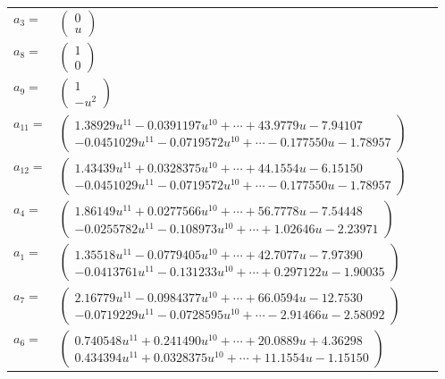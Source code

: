 \documentclass[1p]{elsarticle_modified}
\theoremstyle{definition}
\begin{document}
\begin{tabular}{m{7pt} m{180pt} m{7pt} m{180pt} }
\flushright $a_{3}=$&$\begin{pmatrix}0\\u\end{pmatrix}$ \\
\flushright $a_{8}=$&$\begin{pmatrix}1\\0\end{pmatrix}$ \\
\flushright $a_{9}=$&$\begin{pmatrix}1\\- u^2\end{pmatrix}$ \\
\flushright $a_{11}=$&$\begin{pmatrix}1.38929 u^{11}-0.0391197 u^{10}+\cdots+43.9779 u-7.94107\\-0.0451029 u^{11}-0.0719572 u^{10}+\cdots-0.177550 u-1.78957\end{pmatrix}$ \\
\flushright $a_{12}=$&$\begin{pmatrix}1.43439 u^{11}+0.0328375 u^{10}+\cdots+44.1554 u-6.15150\\-0.0451029 u^{11}-0.0719572 u^{10}+\cdots-0.177550 u-1.78957\end{pmatrix}$ \\
\flushright $a_{4}=$&$\begin{pmatrix}1.86149 u^{11}+0.0277566 u^{10}+\cdots+56.7778 u-7.54448\\-0.0255782 u^{11}-0.108973 u^{10}+\cdots+1.02646 u-2.23971\end{pmatrix}$ \\
\flushright $a_{1}=$&$\begin{pmatrix}1.35518 u^{11}-0.0779405 u^{10}+\cdots+42.7077 u-7.97390\\-0.0413761 u^{11}-0.131233 u^{10}+\cdots+0.297122 u-1.90035\end{pmatrix}$ \\
\flushright $a_{7}=$&$\begin{pmatrix}2.16779 u^{11}-0.0984377 u^{10}+\cdots+66.0594 u-12.7530\\-0.0719229 u^{11}-0.0728595 u^{10}+\cdots-2.91466 u-2.58092\end{pmatrix}$ \\
\flushright $a_{6}=$&$\begin{pmatrix}0.740548 u^{11}+0.241490 u^{10}+\cdots+20.0889 u+4.36298\\0.434394 u^{11}+0.0328375 u^{10}+\cdots+11.1554 u-1.15150\end{pmatrix}$ \\

\end{tabular}
\end{document}
